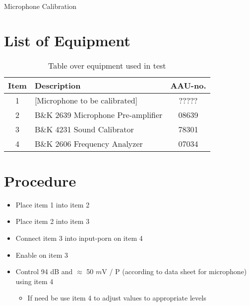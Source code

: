 \documentclass[12pt,a4paper,openright]{article}
\newcommand{\ra}[1]{\renewcommand{\arraystretch}{#1}}
\begin{document}
\begin{Huge}
\begin{center}
Microphone Calibration
\end{center}
\end{Huge}


\section{List of Equipment}
\begin{table}[h]
	\centering
	\ra{1.3}
	\begin{tabular}{ c l c } \toprule
		{Item} &	{Description} & {AAU-no}. \\ \bottomrule 
		1	&	[Microphone to be calibrated]			& ?????			\\
		2	&	B\&K 2639 Microphone Pre-amplifier		& 08639			\\  
		3	&	B\&K 4231 Sound Calibrator				& 78301			\\
		4	&	B\&K 2606 Frequency Analyzer			& 07034			\\ \bottomrule 
	\end{tabular}
	\caption{Table over equipment used in test}
	\label{tab:UsedEquipmentListning}
\end{table}

\section{Procedure}
\begin{itemize}
	\item Place item 1 into item 2
	\item Place item 2 into item 3
	\item Connect item 3 into input-porn on item 4
	\item Enable on item 3
	\item Control 94 dB and $\approx$ 50 $m$V / P (according to data sheet for microphone) using item 4
	\begin{itemize}
		\item If need be use item 4 to adjust values to appropriate levels
	\end{itemize}
\end{itemize}
\end{document}
